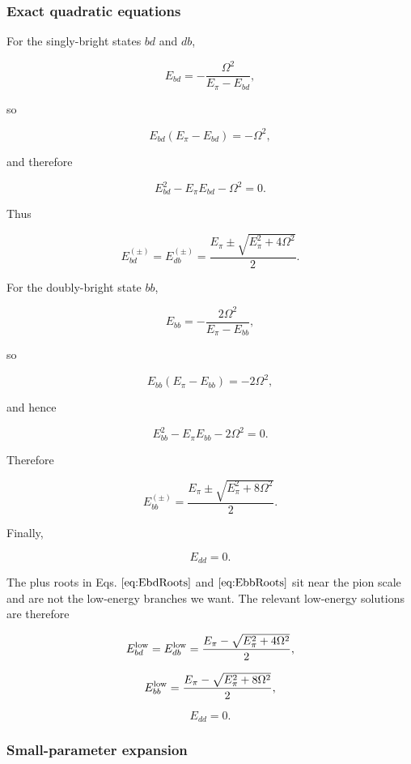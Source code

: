 \documentclass[
]{article}
\renewcommand{\[}{\begin{equation}}
\renewcommand{\]}{\end{equation}}
\begin{document}
\subsubsection{Exact quadratic
equations}\label{exact-quadratic-equations}

For the singly-bright states \(bd\) and \(db\),

\[
E_{bd}=-\frac{\Omega^2}{E_\pi-E_{bd}},
\label{eq:EbdImplicit}
\]

so

\[
E_{bd}(E_\pi-E_{bd})=-\Omega^2,
\label{eq:EbdQuadraticStep}
\]

and therefore

\[
E_{bd}^2-E_\pi E_{bd}-\Omega^2=0.
\label{eq:EbdQuadratic}
\]

Thus

\[
E_{bd}^{(\pm)}=E_{db}^{(\pm)}=\frac{E_\pi\pm\sqrt{E_\pi^2+4\Omega^2}}{2}.
\label{eq:EbdRoots}
\]

For the doubly-bright state \(bb\),

\[
E_{bb}=-\frac{2\Omega^2}{E_\pi-E_{bb}},
\label{eq:EbbImplicit}
\]

so

\[
E_{bb}(E_\pi-E_{bb})=-2\Omega^2,
\label{eq:EbbQuadraticStep}
\]

and hence

\[
E_{bb}^2-E_\pi E_{bb}-2\Omega^2=0.
\label{eq:EbbQuadratic}
\]

Therefore

\[
E_{bb}^{(\pm)}=\frac{E_\pi\pm\sqrt{E_\pi^2+8\Omega^2}}{2}.
\label{eq:EbbRoots}
\]

Finally,

\[
E_{dd}=0.
\label{eq:EddExactLast}
\]

The plus roots in Eqs. \(\ref{eq:EbdRoots}\) and \(\ref{eq:EbbRoots}\)
sit near the pion scale and are not the low-energy branches we want. The
relevant low-energy solutions are therefore

\[
E_{bd}^{\rm low}=E_{db}^{\rm low}=\frac{E_\pi-\sqrt{E_\pi^2+4\Omega^2}}{2},
\label{eq:EbdLow}
\]

\[
E_{bb}^{\rm low}=\frac{E_\pi-\sqrt{E_\pi^2+8\Omega^2}}{2},
\label{eq:EbbLow}
\]

\[
E_{dd}=0.
\label{eq:EddLow}
\]

\subsubsection{Small-parameter
expansion}\label{small-parameter-expansion}
\end{document}
